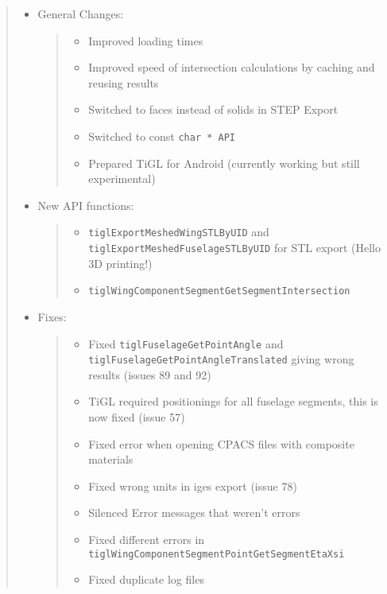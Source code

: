 \documentclass[]{scrartcl}
\begin{document}
\begin{quote}
\begin{itemize}
\item
  General Changes:

  \begin{quote}
  \begin{itemize}
  \itemsep1pt\parskip0pt
  \item
    Improved loading times
  \item
    Improved speed of intersection calculations by caching and reusing
    results
  \item
    Switched to faces instead of solids in STEP Export
  \item
    Switched to const \texttt{char * API}
  \item
    Prepared TiGL for Android (currently working but still experimental)
  \end{itemize}
  \end{quote}
\item
  New API functions:

  \begin{quote}
  \begin{itemize}
  \itemsep1pt\parskip0pt
  \item
    \texttt{tiglExportMeshedWingSTLByUID} and
    \texttt{tiglExportMeshedFuselageSTLByUID} for STL export (Hello 3D
    printing!)
  \item
    \texttt{tiglWingComponentSegmentGetSegmentIntersection}
  \end{itemize}
  \end{quote}
\item
  Fixes:

  \begin{quote}
  \begin{itemize}
  \itemsep1pt\parskip0pt
  \item
    Fixed \texttt{tiglFuselageGetPointAngle} and
    \texttt{tiglFuselageGetPointAngleTranslated} giving wrong results
    (issues 89 and 92)
  \item
    TiGL required positionings for all fuselage segments, this is now
    fixed (issue 57)
  \item
    Fixed error when opening CPACS files with composite materials
  \item
    Fixed wrong units in iges export (issue 78)
  \item
    Silenced Error messages that weren't errors
  \item
    Fixed different errors in
    \texttt{tiglWingComponentSegmentPointGetSegmentEtaXsi}
  \item
    Fixed duplicate log files
  \end{itemize}
  \end{quote}
\end{itemize}
\end{quote}
\end{document}
